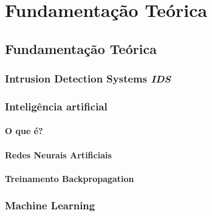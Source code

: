 \part{Fundamentação Teórica}
\chapter[Fundamentação Teórica]{Fundamentação Teórica}

\section{Intrusion Detection Systems \textit{IDS}}
    

\section{Inteligência artificial}
    \subsection{O que é?}
        
    \subsection{Redes Neurais Artificiais}
        
    \subsection{Treinamento Backpropagation}
        

\section{Machine Learning}
    